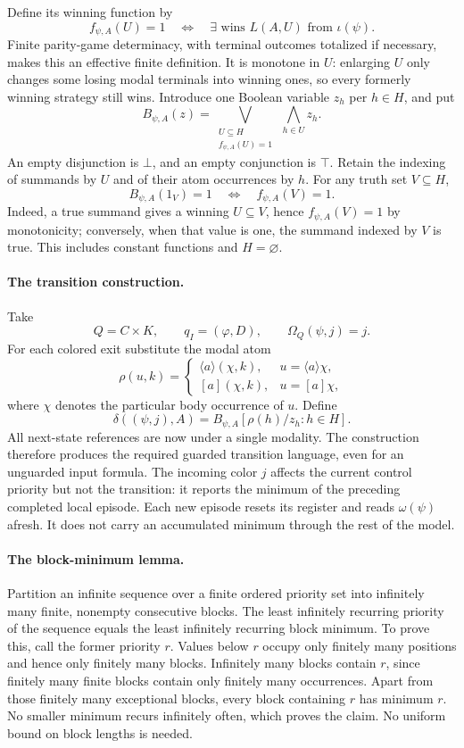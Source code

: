 Define its winning function by
\[
 f_{\psi,A}(U)=1
 \quad\Longleftrightarrow\quad
 \exists\text{ wins }L(A,U)\text{ from }\iota(\psi).
\]
Finite parity-game determinacy, with terminal
outcomes totalized if necessary, makes this
an effective finite definition. It is monotone
in \(U\): enlarging \(U\) only changes some
losing modal terminals into winning ones, so
every formerly winning strategy still wins.
Introduce one Boolean variable \(z_h\) per
\(h\in H\), and put
\[
 B_{\psi,A}(z)=
 \bigvee_{\substack{U\subseteq H\\f_{\psi,A}(U)=1}}
       \ \bigwedge_{h\in U}z_h.
\]
An empty disjunction is \(\bot\), and an empty
conjunction is \(\top\). Retain the indexing
of summands by \(U\) and of their atom occurrences
by \(h\). For any truth set \(V\subseteq H\),
\[
 B_{\psi,A}(1_V)=1\quad\Longleftrightarrow\quad
 f_{\psi,A}(V)=1.
\]
Indeed, a true summand gives a winning
\(U\subseteq V\), hence \(f_{\psi,A}(V)=1\)
by monotonicity; conversely, when that value
is one, the summand indexed by \(V\) is true.
This includes constant functions and \(H=\varnothing\).

\paragraph{The transition construction.}
Take
\[
 Q=C\times K,\qquad
 q_I=(\varphi,D),\qquad
 \Omega_Q(\psi,j)=j.
\]
For each colored exit substitute the modal atom
\[
 \rho(u,k)=
 \begin{cases}
  \langle a\rangle(\chi,k),&u=\langle a\rangle\chi,\\
  [a](\chi,k),&u=[a]\chi,
 \end{cases}
\]
where \(\chi\) denotes the particular body
occurrence of \(u\). Define
\[
 \delta((\psi,j),A)=
 B_{\psi,A}[\rho(h)/z_h:h\in H].
\]
All next-state references are now under a
single modality. The construction therefore
produces the required guarded transition
language, even for an unguarded input formula.
The incoming color \(j\) affects the current
control priority but not the transition:
it reports the minimum of the preceding
completed local episode. Each new episode
resets its register and reads \(\omega(\psi)\)
afresh. It does not carry an accumulated
minimum through the rest of the model.

\paragraph{The block-minimum lemma.}
Partition an infinite sequence over a finite
ordered priority set into infinitely many
finite, nonempty consecutive blocks. The
least infinitely recurring priority of the
sequence equals the least infinitely recurring
block minimum. To prove this, call the former
priority \(r\). Values below \(r\) occupy only
finitely many positions and hence only finitely
many blocks. Infinitely many blocks contain
\(r\), since finitely many finite blocks
contain only finitely many occurrences.
Apart from those finitely many exceptional
blocks, every block containing \(r\) has
minimum \(r\). No smaller minimum recurs
infinitely often, which proves the claim.
No uniform bound on block lengths is needed.

